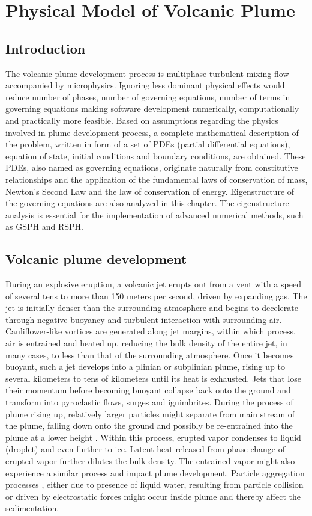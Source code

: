 \chapter{Physical Model of Volcanic Plume} \label{chapter:physics-model}
\section{Introduction}
The volcanic plume development process is multiphase turbulent mixing flow accompanied by microphysics. Ignoring less dominant physical effects would reduce number of phases, number of governing equations, number of terms in governing equations making software development numerically, computationally and practically more feasible. Based on assumptions regarding the physics involved in plume development process, a complete mathematical description of the problem, written in form of a set of PDEs (partial differential equations), equation of state, initial conditions and boundary conditions, are obtained. These PDEs, also named as governing equations, originate naturally
from constitutive relationships and the application of the fundamental laws of conservation of mass, Newton's Second Law and the law of conservation of energy. Eigenstructure of the governing equations are also analyzed in this chapter. The eigenstructure analysis is essential for the implementation of advanced numerical methods, such as GSPH and RSPH.

\section{Volcanic plume development}
During an explosive eruption, a volcanic jet erupts out from a vent with a speed of several tens to more than 150 meters per second, driven by expanding gas. The jet is initially denser than the surrounding atmosphere and begins to decelerate through negative buoyancy and turbulent interaction with surrounding air. Cauliflower-like vortices are generated along jet margins, within which process, air is entrained and heated up, reducing the bulk density of the entire jet, in many cases, to less than that of the surrounding atmosphere. Once it becomes buoyant, such a jet develops into a plinian or subplinian plume, rising up to several kilometers to tens of kilometers until its heat is exhausted. Jets that lose their momentum before becoming buoyant collapse back onto the ground and transform into pyroclastic flows, surges and ignimbrites. During the process of plume rising up, relatively larger particles might separate from main stream of the plume, falling down onto the ground and possibly be re-entrained into the plume at a lower height \citep{ernst1996sedimentation}. Within this process, erupted vapor condenses to liquid (droplet) and even further to ice. Latent heat released from phase change of erupted vapor further dilutes the bulk density. The entrained vapor might also experience a similar process and impact plume development. Particle aggregation processes \citep{carey1982influence,taddeucci2011aggregation}, either due to presence of liquid water, resulting from particle collision or driven by electrostatic forces might occur inside plume and thereby affect the sedimentation. 

